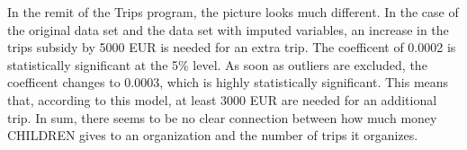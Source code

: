 \documentclass[12pt, a4paper, titlepage]{article}\usepackage[]{graphicx}\usepackage[]{color}
\begin{document}
In the remit of the Trips program, the picture looks much different. In the case of the original data set and the data set with imputed variables, an increase in the trips subsidy by 5000 EUR is needed for an extra trip. The coefficent of 0.0002 is statistically significant at the 5\% level. As soon as outliers are excluded, the coefficent changes to 0.0003, which is highly statistically significant. This means that, according to this model, at least 3000 EUR are needed for an additional trip.
In sum, there seems to be no clear connection between how much money CHILDREN gives to an organization and the number of trips it organizes. 


\usepackage{booktabs}

\begin{table}
\caption{Association between number of trips and real subsidy}
\begin{center}
\end{center}
\end{table}
\end{document}

